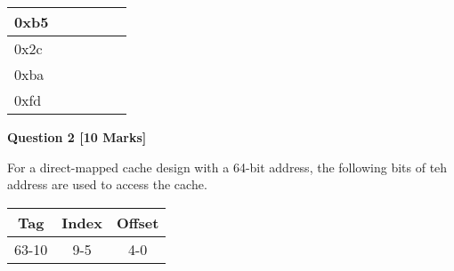 \documentclass[addpoints]{exam}
\begin{document}
\begin{sloppypar}
\begin{questions}
\begin{parts}
\begin{tabular}{| m{15mm} | m{15mm} | m{15mm} | m{15mm} | m{15mm} | m{20mm} |}
            \centering 0xb5 & &\centering  &\centering  &\centering  &\hspace*{6.5mm} \\ \hline
            \centering 0x2c & &\centering  &\centering  &\centering  &\hspace*{6.5mm} \\ \hline
            \centering 0xba & &\centering  &\centering  &\centering  &\hspace*{6.5mm} \\ \hline
            \centering 0xfd & &\centering  &\centering  &\centering  &\hspace*{6.5mm} \\ \hline
        \end{tabular}
    \end{parts}

    \question[10]
    \begin{center} \textbf{Question 2 [10 Marks]}\end{center}
    For a direct-mapped cache design with a 64-bit address, the following bits of teh address are used to access the cache.

    \begin{tabular}{| c | c | c |}
        \hline \hspace*{8mm}\textbf{Tag}\hspace*{8mm} & \hspace*{8mm}\textbf{Index}\hspace*{8mm} & \hspace*{8mm}\textbf{Offset}\hspace*{8mm} \\ \hline
        63-10 & 9-5 & 4-0 \\ \hline
    \end{tabular}

\end{questions}
\end{sloppypar}
\end{document}
